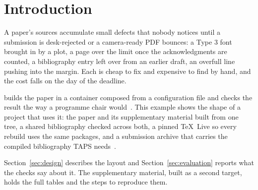 \section{Introduction}

A paper's sources accumulate small defects that nobody notices until a
submission is desk-rejected or a camera-ready PDF bounces: a Type 3 font
brought in by a plot, a page over the limit once the acknowledgments are
counted, a bibliography entry left over from an earlier draft, an overfull
line pushing into the margin. Each is cheap to fix and expensive to find by
hand, and the cost falls on the day of the deadline.

\sys builds the paper in a container composed from a configuration file and
checks the result the way a programme chair would~\cite{reproducible}. This
example shows the shape of a project that uses it: the paper and its
supplementary material built from one tree, a shared bibliography checked
across both, a pinned \TeX\ Live so every rebuild uses the same packages, and
a submission archive that carries the compiled bibliography TAPS
needs~\cite{acmart}.

Section~\ref{sec:design} describes the layout and Section~\ref{sec:evaluation}
reports what the checks say about it. The supplementary material, built as a
second target, holds the full tables and the steps to reproduce them.
